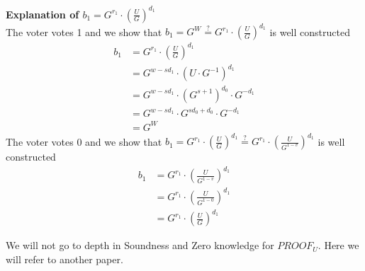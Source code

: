 \noindent
\textbf{Explanation of \begin{math}b_1= G^{r_1}  \cdot (\frac{U}{G})^{d_1}\end{math}}\\

\noindent
The voter votes 1 and we show that \begin{math}b_1=   G^W \stackrel{?}{=} G^{r_1}  \cdot (\frac{U}{G})^{d_1} \end{math} is well constructed \begin{align*}
    b_1 &= G^{r_1}  \cdot (\frac{U}{G})^{d_1}                   \\
        &= G^{w-sd_1} \cdot (U \cdot G^{-1})^{d_1}              \\
        &= G^{w-sd_1} \cdot  (G^{s+1})^{d_0} \cdot G^{-d_1}     \\
        &= G^{w-sd_1} \cdot  G^{sd_0+d_0} \cdot G^{-d_1}        \\
        &= G^W
\end{align*}
The voter votes 0 and we show that  \begin{math}b_1= G^{r_1}  \cdot (\frac{U}{G})^{d_1}  \stackrel{?}{=}  G^{r_1}  \cdot (\frac{U}{G^{1-v}})^{d_1} \end{math} is well constructed
\begin{align*}
    b_1 &= G^{r_1}  \cdot (\frac{U}{G^{1-v}})^{d_1}             \\ 
        &= G^{r_1}  \cdot (\frac{U}{G^{1-0}})^{d_1}             \\
        &= G^{r_1}  \cdot (\frac{U}{G})^{d_1}
\end{align*}



\noindent
We will not go to depth in Soundness and Zero knowledge for $PROOF_U$. Here we will refer to another paper. \cite{Cramer1994}



